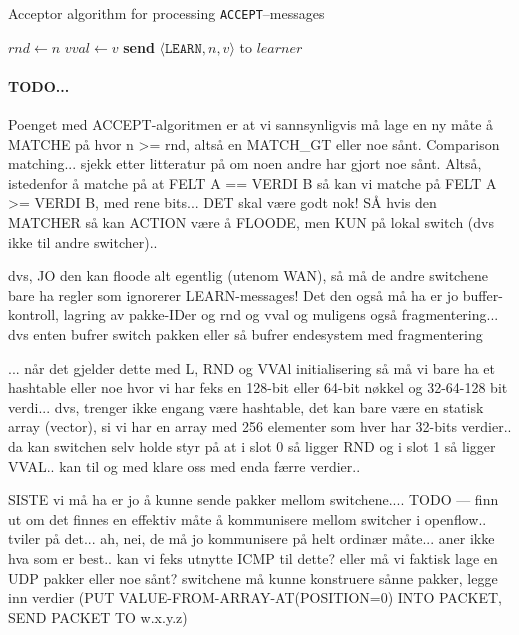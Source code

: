 \begin{algorithm}[H]
  \caption{Acceptor algorithm for processing \texttt{ACCEPT}--messages}
  \label{paxos.algorithm.acceptor}
  \begin{algorithmic}
        \State $rnd\gets n$
        \State $vval\gets v$
           \State \textbf{send} $\langle \texttt{LEARN}, n, v \rangle $ to $learner$
        \EndFor
      \EndIf
    \EndOn
  \end{algorithmic}
\end{algorithm}

\paragraph{TODO...}

Poenget med ACCEPT-algoritmen er at vi sannsynligvis må lage en ny måte å
MATCHE på hvor n >= rnd, altså en MATCH\_{}GT eller noe sånt.  Comparison
matching... sjekk etter litteratur på om noen andre har gjort noe sånt.
Altså, istedenfor å matche på at FELT A == VERDI B så kan vi matche på FELT
A >= VERDI B, med rene bits... DET skal være godt nok!  SÅ hvis den MATCHER
så kan ACTION være å FLOODE, men KUN på lokal switch (dvs ikke til andre
switcher)..

dvs, JO den kan floode alt egentlig (utenom WAN), så må de
andre switchene bare ha regler som ignorerer LEARN-messages! Det den også må
ha er jo buffer-kontroll, lagring av pakke-IDer og rnd og vval og muligens
også fragmentering...  dvs enten bufrer switch pakken eller så bufrer
endesystem med fragmentering

... når det gjelder dette med L, RND og VVAl initialisering så må vi bare ha
et hashtable eller noe hvor vi har feks en 128-bit eller 64-bit nøkkel og
32-64-128 bit verdi... dvs, trenger ikke engang være hashtable, det kan bare
være en statisk array (vector), si vi har en array med 256 elementer som
hver har 32-bits verdier.. da kan switchen selv holde styr på at i slot 0 så
ligger RND og i slot 1 så ligger VVAL.. kan til og med klare oss med enda
færre verdier..

SISTE vi må ha er jo å kunne sende pakker mellom switchene....
TODO --- finn ut om det finnes en effektiv måte å kommunisere mellom
switcher i openflow.. tviler på det... ah, nei, de må jo kommunisere på helt
ordinær måte... aner ikke hva som er best.. kan vi feks utnytte ICMP til
dette? eller må vi faktisk lage en UDP pakker eller noe sånt?
switchene må kunne konstruere sånne pakker, legge inn verdier
(PUT VALUE-FROM-ARRAY-AT(POSITION=0) INTO PACKET, SEND PACKET TO w.x.y.z)


